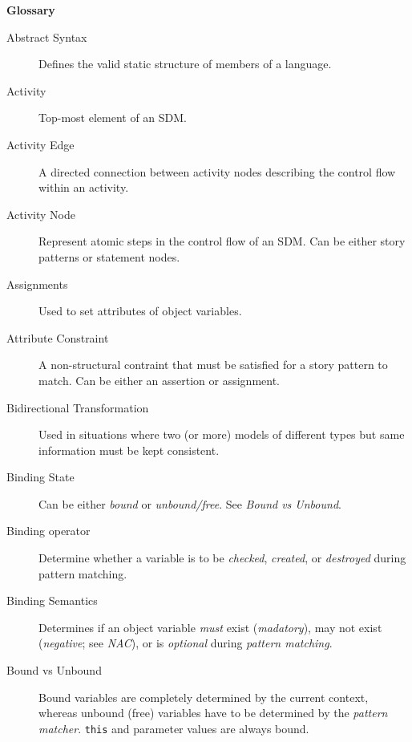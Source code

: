 \newpage
{}
{}
\hypertarget{glossary}{}
\genHeader

\vspace{1cm}
{\Huge \bf Glossary}
\vspace{1cm}

\normalsize{}

\begin{description}

\item[Abstract Syntax] 
Defines the valid static structure of members of a language. 

\item[Activity]
Top-most element of an SDM.

\item[Activity Edge]
A directed connection between activity nodes describing the control flow within an activity.

\item[Activity Node]
Represent atomic steps in the control flow of an SDM. Can be either story patterns or statement nodes.

\item[Assignments]
Used to set attributes of object variables.

\item[Attribute Constraint]
A non-structural contraint that must be satisfied for a story pattern to match. Can be either an assertion or assignment.

\item[Bidirectional Transformation]  Used in situations where two (or more) models of different types but same information must be kept consistent.

\item[Binding State]
Can be either \emph{bound} or \emph{unbound/free}. See \emph{Bound vs Unbound}.

\item[Binding operator]
Determine whether a variable is to be \emph{checked}, \emph{created}, or \emph{destroyed} during pattern matching.

\item[Binding Semantics]
Determines if an object variable \emph{must} exist (\emph{madatory}), may not exist (\emph{negative}; see \emph{NAC}), or is \emph{optional} during
\emph{pattern matching}.

\item[Bound vs Unbound]
Bound variables are completely determined by the current context, whereas unbound (free) variables have to be determined by the \emph{pattern matcher}.
\texttt{this} and parameter values are always bound.


\end{description}
